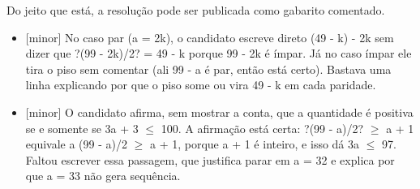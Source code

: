 \documentclass{article}%
\begin{document}
\newline%
Do jeito que está, a resolução pode ser publicada como gabarito comentado.%
\begin{itemize}%
\item%
{[}minor{]} No caso par (a = 2k), o candidato escreve direto (49 - k) - 2k sem dizer que ?(99 - 2k)/2? = 49 - k porque 99 - 2k é ímpar. Já no caso ímpar ele tira o piso sem comentar (ali 99 - a é par, então está certo). Bastava uma linha explicando por que o piso some ou vira 49 - k em cada paridade.%
\item%
{[}minor{]} O candidato afirma, sem mostrar a conta, que a quantidade é positiva se e somente se 3a + 3 $\leq$ 100. A afirmação está certa: ?(99 - a)/2? $\geq$ a + 1 equivale a (99 - a)/2 $\geq$ a + 1, porque a + 1 é inteiro, e isso dá 3a $\leq$ 97. Faltou escrever essa passagem, que justifica parar em a = 32 e explica por que a = 33 não gera sequência.%
\end{itemize}%
\end{document}
